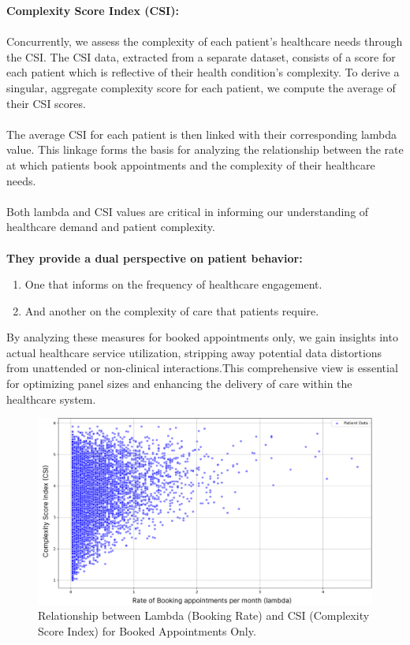 \documentclass[11pt]{article}
\theoremstyle{definition}
\begin{document}
\textbf{Complexity Score Index (CSI):}\\\\
Concurrently, we assess the complexity of each patient's healthcare needs through the CSI. The CSI data, extracted from a separate dataset, consists of a score for each patient which is reflective of their health condition's complexity. To derive a singular, aggregate complexity score for each patient, we compute the average of their CSI scores.\\\\
The average CSI for each patient is then linked with their corresponding lambda value. This linkage forms the basis for analyzing the relationship between the rate at which patients book appointments and the complexity of their healthcare needs.\\\\
Both lambda and CSI values are critical in informing our understanding of healthcare demand and patient complexity.\\\\
\textbf{They provide a dual perspective on patient behavior:}
\begin{enumerate}
    \item One that informs on the frequency of healthcare engagement.
    \item And another on the complexity of care that patients require.
\end{enumerate}
By analyzing these measures for booked appointments only, we gain insights into actual healthcare service utilization, stripping away potential data distortions from unattended or non-clinical interactions.This comprehensive view is essential for optimizing panel sizes and enhancing the delivery of care within the healthcare system.

\begin{figure}[H]
    \centering
    \includegraphics[width=1\textwidth]{CSI vs Lambda.png}
    \caption{Relationship between Lambda (Booking Rate) and CSI (Complexity Score Index) for Booked Appointments Only.}
    \label{fig:lambda_csi}
\end{figure}
\end{document}
